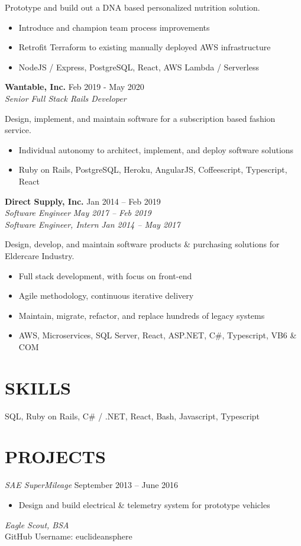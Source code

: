 \documentclass[line,margin]{res}
\begin{document}
\begin{resume}
Prototype and build out a DNA based personalized nutrition solution.

\begin{itemize}
\item Introduce and champion team process improvements
\item Retrofit Terraform to existing manually deployed AWS infrastructure
\item NodeJS / Express, PostgreSQL, React, AWS Lambda / Serverless
\end{itemize}

\textbf{Wantable, Inc.} \hfill Feb 2019 - May 2020 \\
{\sl Senior Full Stack Rails Developer}

Design, implement, and maintain software for a subscription based fashion service.

\begin{itemize}
\item Individual autonomy to architect, implement, and deploy software solutions
\item Ruby on Rails, PostgreSQL, Heroku, AngularJS, Coffeescript, Typescript, \\ React
\end{itemize}

\textbf{Direct Supply, Inc.} \hfill Jan 2014 -- Feb 2019 \\
{\sl Software Engineer} \hfill {\sl May 2017 -- Feb 2019} \\
{\sl Software Engineer, Intern} \hfill {\sl Jan 2014 -- May 2017}

Design, develop, and maintain software products \& purchasing solutions for Eldercare Industry.

\begin{itemize}
\item Full stack development, with focus on front-end
\item Agile methodology, continuous iterative delivery
\item Maintain, migrate, refactor, and replace hundreds of legacy systems
\item AWS, Microservices, SQL Server, React, ASP.NET, C\#, Typescript, VB6 \& COM
\end{itemize}

\section{SKILLS}
SQL, Ruby on Rails, C\# / .NET, React, Bash, Javascript, Typescript

\section{PROJECTS}

{\sl SAE SuperMileage} \hfill September 2013 -- June 2016
\begin{itemize}
\item Design and build electrical \& telemetry system for prototype vehicles
\end{itemize}

{\sl Eagle Scout, BSA} \\

GitHub Username: euclideansphere

\end{resume}
\end{document}

